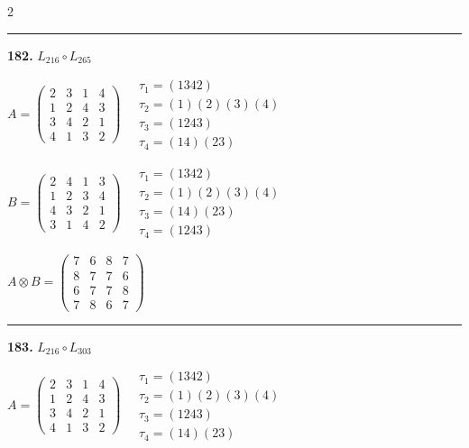\begin{multicols}{2}
\vspace{0.3em}
\hrule
\vspace{0.3em}

\noindent\textbf{182.} $L_{216} \circ L_{265}$

$A = \begin{pmatrix} 2 & 3 & 1 & 4 \\ 1 & 2 & 4 & 3 \\ 3 & 4 & 2 & 1 \\ 4 & 1 & 3 & 2 \end{pmatrix} \quad \begin{matrix} \tau_{1}=(1 3 4 2) \\ \tau_{2}=(1)(2)(3)(4) \\ \tau_{3}=(1 2 4 3) \\ \tau_{4}=(1 4)(2 3) \end{matrix}$

$B = \begin{pmatrix} 2 & 4 & 1 & 3 \\ 1 & 2 & 3 & 4 \\ 4 & 3 & 2 & 1 \\ 3 & 1 & 4 & 2 \end{pmatrix} \quad \begin{matrix} \tau_{1}=(1 3 4 2) \\ \tau_{2}=(1)(2)(3)(4) \\ \tau_{3}=(1 4)(2 3) \\ \tau_{4}=(1 2 4 3) \end{matrix}$

$A \otimes B = \begin{pmatrix} 7 & 6 & 8 & 7 \\ 8 & 7 & 7 & 6 \\ 6 & 7 & 7 & 8 \\ 7 & 8 & 6 & 7 \end{pmatrix}$

\vspace{0.3em}
\hrule
\vspace{0.3em}

\noindent\textbf{183.} $L_{216} \circ L_{303}$

$A = \begin{pmatrix} 2 & 3 & 1 & 4 \\ 1 & 2 & 4 & 3 \\ 3 & 4 & 2 & 1 \\ 4 & 1 & 3 & 2 \end{pmatrix} \quad \begin{matrix} \tau_{1}=(1 3 4 2) \\ \tau_{2}=(1)(2)(3)(4) \\ \tau_{3}=(1 2 4 3) \\ \tau_{4}=(1 4)(2 3) \end{matrix}$


\end{multicols}
